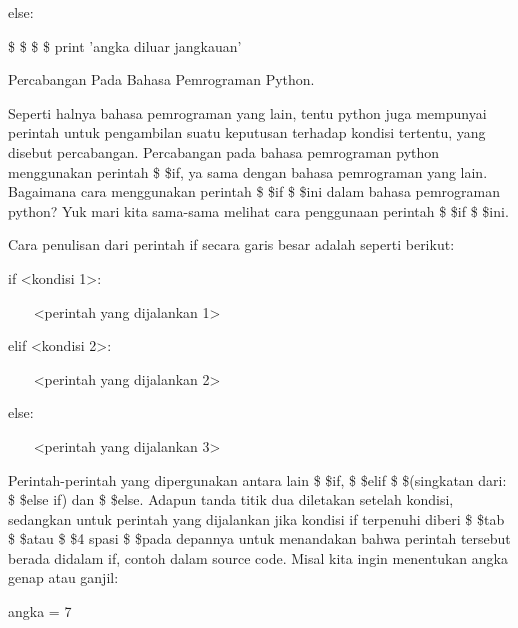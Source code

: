 else: \par
\noindent 
\vspace{\baselineskip}
 \$  \$  \$  \$ print 'angka diluar jangkauan' \par
\vspace{12pt}
\noindent 
Percabangan Pada Bahasa Pemrograman Python. \par
\vspace{12pt}
\noindent 
Seperti halnya bahasa pemrograman yang lain, tentu python juga mempunyai perintah untuk pengambilan suatu keputusan terhadap kondisi tertentu, yang disebut percabangan. Percabangan pada bahasa pemrograman python menggunakan perintah \$  \$if, ya sama dengan bahasa pemrograman yang lain. Bagaimana cara menggunakan perintah \$  \$if \$  \$ini dalam bahasa pemrograman python? Yuk mari kita sama-sama melihat cara penggunaan perintah \$  \$if \$  \$ini. \par
\vspace{12pt}
\noindent 
Cara penulisan dari perintah if secara garis besar adalah seperti berikut: \par
\noindent 
if <kondisi 1>: \par
\vspace{12pt}
\noindent 
~~~ <perintah yang dijalankan 1> \par
\vspace{12pt}
\noindent 
elif <kondisi 2>: \par
\vspace{12pt}
\noindent 
~~~ <perintah yang dijalankan 2> \par
\vspace{12pt}
\noindent 
else: \par
\vspace{12pt}
\noindent 
~~~ <perintah yang dijalankan 3> \par
\vspace{12pt}
\noindent 
Perintah-perintah yang dipergunakan antara lain \$  \$if, \$  \$elif \$  \$(singkatan dari: \$  \$else if) dan \$  \$else. Adapun tanda titik dua diletakan setelah kondisi, sedangkan untuk perintah yang dijalankan jika kondisi if terpenuhi diberi \$  \$tab \$  \$atau \$  \$4 spasi \$  \$pada depannya untuk menandakan bahwa perintah tersebut berada didalam if, contoh dalam source code. Misal kita ingin menentukan angka genap atau ganjil: \par
\vspace{12pt}
\noindent 
angka = 7 \par
\vspace{12pt}
\noindent 
